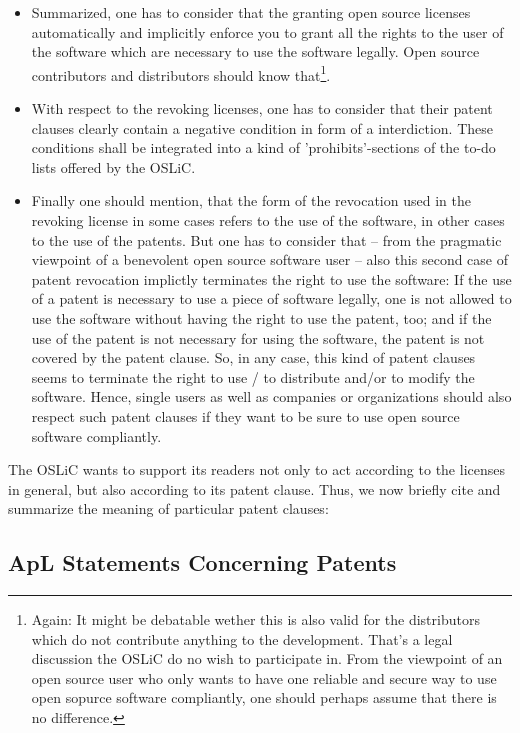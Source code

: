 \begin{itemize}
  \item Summarized, one has to consider that the granting open source licenses
  automatically and implicitly enforce you to grant all the rights to the user
  of the software which are necessary to use the software legally. Open source
  contributors and distributors should know that\footnote{Again: It might be
  debatable wether this is also valid for the distributors which do not
  contribute anything to the development. That's a legal discussion the OSLiC do
  no wish to participate in. From the viewpoint of an open source user who only
  wants to have one reliable and secure way to use open sopurce software
  compliantly, one should perhaps assume that there is no difference.}.

  \item With respect to the revoking licenses, one has to consider that their
  patent clauses clearly contain a negative condition in form of a interdiction.
  These conditions shall be integrated into a kind of 'prohibits'-sections of
  the to-do lists offered by the OSLiC.
  
  \item Finally one should mention, that the form of the revocation used in the
  revoking license in some cases refers to the use of the software, in other
  cases to the use of the patents. But one has to consider that -- from the
  pragmatic viewpoint of a benevolent open source software user -- also this
  second case of patent revocation implictly terminates the right to use the
  software: If the use of a patent is necessary to use a piece of software
  legally, one is not allowed to use the software without having the right to
  use the patent, too; and if the use of the patent is not necessary for using
  the software, the patent is not covered by the patent clause. So, in any case,
  this kind of patent clauses seems to terminate the right to use / to
  distribute and/or to modify the software. Hence, single users as well as
  companies or organizations should also respect such patent clauses if they
  want to be sure to use open source software compliantly.
\end{itemize}

The OSLiC wants to support its readers not only to act according to the licenses
in general, but also according to its patent clause. Thus, we now briefly cite
and summarize the meaning of particular patent clauses:

\subsection{ApL Statements Concerning Patents}\label{subsec:ApLPatentClause}

